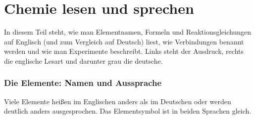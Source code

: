 \newpage
\part{Chemie lesen und sprechen}

In diesem Teil steht, wie man Elementnamen, Formeln und Reaktionsgleichungen auf Englisch (und zum
Vergleich auf Deutsch) liest, wie Verbindungen benannt werden und wie man Experimente beschreibt.
Links steht der Ausdruck, rechts die englische Lesart und darunter grau die deutsche.

\section{Die Elemente: Namen und Aussprache}

Viele Elemente heißen im Englischen anders als im Deutschen oder werden deutlich anders
ausgesprochen. Das Elementsymbol ist in beiden Sprachen gleich.


